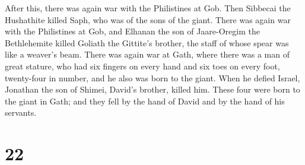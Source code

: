  After this, there was again war with the Philistines at
Gob. Then Sibbecai the Hushathite killed Saph, who was of the sons of
the giant.  There was again war with the Philistines at
Gob, and Elhanan the son of Jaare-Oregim the Bethlehemite killed Goliath
the Gittite's brother, the staff of whose spear was like a weaver's
beam.  There was again war at Gath, where there was a man
of great stature, who had six fingers on every hand and six toes on
every foot, twenty-four in number, and he also was born to the giant.
 When he defied Israel, Jonathan the son of Shimei, David's
brother, killed him.  These four were born to the giant in
Gath; and they fell by the hand of David and by the hand of his
servants.

\hypertarget{section-21}{%
\section{22}\label{section-21}}

